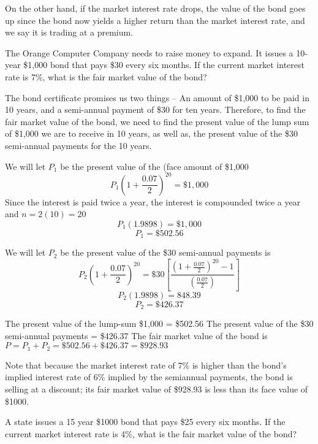 On the other hand, if the market interest rate drops, the value of the bond goes up since the bond now yields a higher return than the market interest rate, and we say it is trading at a premium.


\begin{example}
    The Orange Computer Company needs to raise money to expand. It issues a 10-year \$1,000 bond that pays \$30 every six months. If the current market interest rate is 7\%, what is the fair market value of the bond?
\end{example}

\begin{solution}
    The bond certificate promises us two things – An amount of \$1,000 to be paid in 10 years, and a semi-annual payment of \$30 for ten years. Therefore, to find the fair market value of the bond, we need to find the present value of the lump sum of \$1,000 we are to receive in 10 years, as well as, the present value of the \$30 semi-annual payments for the 10 years.

    We will let \( P_1 \) be the present value of the (face amount of \$1,000
    \[ P_1 \left( 1 + \frac{0.07}{2} \right)^{20} = \$1,000 \]
    Since the interest is paid twice a year, the interest is compounded twice a year and \( n = 2(10)=20 \)
    \[ P_1 (1.9898) = \$1,000 \]
    \[ P_1 = \$502.56 \]

    We will let \( P_2 \) be the present value of the \$30 semi-annual payments is
    \[ P_2 \left( 1 + \frac{0.07}{2} \right)^{20} = \$30\left[\frac{\left(1+\frac{0.07}{2}\right)^{20}-1}{\left(\frac{0.07}{2}\right)}\right] \]
    \[ P_2 (1.9898) = 848.39 \]
    \[ P_2 = \$426.37 \]

    The present value of the lump-sum \$1,000 = \$502.56
    The present value of the \$30 semi-annual payments = \$426.37
    The fair market value of the bond is \( P = P_1 + P_2 = \$502.56 + \$426.37 = \$928.93 \)

    Note that because the market interest rate of 7\% is higher than the bond’s implied interest rate of 6\% implied by the semiannual payments, the bond is selling at a discount; its fair market value of \$928.93 is less than its face value of \$1000.
\end{solution}

\begin{example}
    A state issues a 15 year \$1000 bond that pays \$25 every six months. If the current market interest rate is 4\%, what is the fair market value of the bond?
\end{example}


